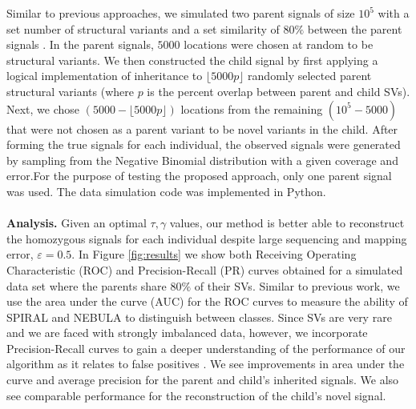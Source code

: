 Similar to previous approaches, we simulated two parent signals of size $10^5$ with a set number of structural variants and a set similarity of $80\%$ between the parent signals \cite{MB_diploidTrios, MB_SingleParentDiploid}. In the parent signals, $5000$ locations were chosen at random to be structural variants. We then constructed the child signal by first applying a logical implementation of inheritance to $\lfloor 5000p \rfloor$ randomly selected parent structural variants (where $p$ is the percent overlap between parent and child SVs). Next, we chose  $(5000 - \lfloor 5000p \rfloor)$ locations from the remaining $(10^5 - 5000)$ that were not chosen as a parent variant to be novel variants in the child.  After forming the true signals for each individual, the observed signals were generated by sampling from the Negative Binomial distribution with a given coverage and error.For the purpose of testing the proposed approach, only one parent signal was used. The data simulation code was implemented in Python. \\\\
\textbf{Analysis.} Given an optimal $\tau, \gamma$ values, our method is better able to reconstruct the homozygous signals for each individual despite large sequencing and mapping error, $\varepsilon = 0.5$. In Figure \ref{fig:results} we show both Receiving Operating Characteristic (ROC) and Precision-Recall (PR) curves obtained for a simulated data set where the parents share $80\%$ of their SVs. Similar to previous work, we use the area under the curve (AUC) for the ROC curves to measure the ability of SPIRAL and NEBULA to distinguish between classes. %
Since SVs are very rare and we are faced with strongly imbalanced data, however, we incorporate Precision-Recall curves to gain a deeper understanding of the performance of our algorithm as it relates to false positives \cite{saito2015precision}. We see improvements in area under the curve and average precision for the parent and child's inherited signals. We also see comparable performance for the reconstruction of the child's novel signal.

